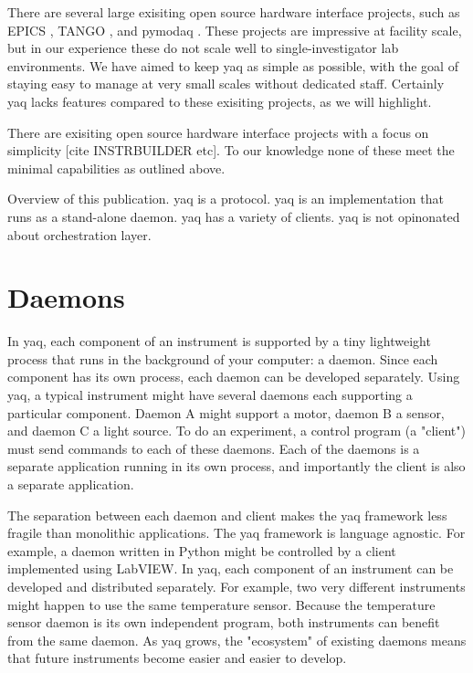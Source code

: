 \documentclass{article}
\begin{document}
There are several large exisiting open source hardware interface projects, such as EPICS \cite{DalesioLR1991a}, TANGO \cite{tango-controls.org}, and pymodaq \cite{WeberSebastien2021a}.
These projects are impressive at facility scale, but in our experience these do not scale well to single-investigator lab environments.
We have aimed to keep yaq as simple as possible, with the goal of staying easy to manage at very small scales without dedicated staff.
Certainly yaq lacks features compared to these exisiting projects, as we will highlight.

There are exisiting open source hardware interface projects with a focus on simplicity [cite INSTRBUILDER etc].
To our knowledge none of these meet the minimal capabilities as outlined above.

Overview of this publication.
yaq is a protocol.
yaq is an implementation that runs as a stand-alone daemon.
yaq has a variety of clients.
yaq is not opinonated about orchestration layer.

\section{Daemons}

In yaq, each component of an instrument is supported by a tiny lightweight process that runs in the background of your computer: a daemon.
Since each component has its own process, each daemon can be developed separately.
Using yaq, a typical instrument might have several daemons each supporting a particular component.
Daemon A might support a motor, daemon B a sensor, and daemon C a light source.
To do an experiment, a control program (a "client") must send commands to each of these daemons.
Each of the daemons is a separate application running in its own process, and importantly the client is also a separate application.

The separation between each daemon and client makes the yaq framework less fragile than monolithic applications.
The yaq framework is language agnostic.
For example, a daemon written in Python might be controlled by a client implemented using LabVIEW.
In yaq, each component of an instrument can be developed and distributed separately.
For example, two very different instruments might happen to use the same temperature sensor.
Because the temperature sensor daemon is its own independent program, both instruments can benefit from the same daemon.
As yaq grows, the "ecosystem" of existing daemons means that future instruments become easier and easier to develop.
\end{document}
